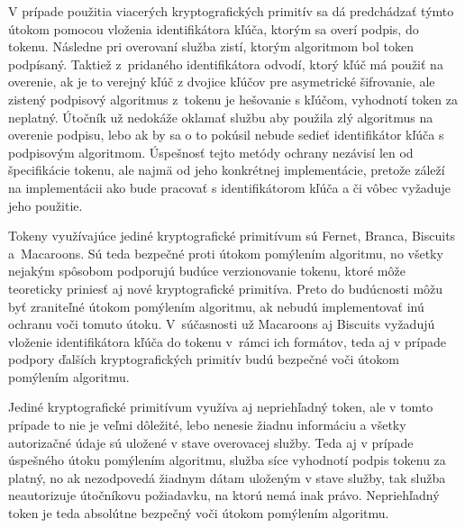 V prípade použitia viacerých kryptografických primitív sa dá predchádzať týmto útokom pomocou vloženia identifikátora kľúča, ktorým sa overí podpis, do tokenu. Následne pri overovaní služba zistí, ktorým algoritmom bol token podpísaný. Taktiež z~pridaného identifikátora odvodí, ktorý kľúč má použiť na overenie, ak je to verejný kľúč z dvojice kľúčov pre asymetrické šifrovanie, ale zistený podpisový algoritmus z~tokenu je hešovanie s kľúčom, vyhodnotí token za neplatný. Útočník už nedokáže oklamať službu aby použila zlý algoritmus na overenie podpisu, lebo ak by sa o to pokúsil nebude sedieť identifikátor kľúča s podpisovým algoritmom. Úspešnosť tejto metódy ochrany nezávisí len od špecifikácie tokenu, ale najmä od jeho konkrétnej implementácie, pretože záleží na implementácii ako bude pracovať s identifikátorom kľúča a či vôbec vyžaduje jeho použitie.

Tokeny využívajúce jediné kryptografické primitívum sú Fernet, Branca, Biscuits a~Macaroons. Sú teda bezpečné proti útokom pomýlením algoritmu, no všetky nejakým spôsobom podporujú budúce verzionovanie tokenu, ktoré môže teoreticky priniesť aj nové kryptografické primitíva. Preto do budúcnosti môžu byť zraniteľné útokom pomýlením algoritmu, ak nebudú implementovať inú ochranu voči tomuto útoku. V~súčasnosti už Macaroons aj Biscuits vyžadujú vloženie identifikátora kľúča do tokenu v~rámci ich formátov, teda aj v prípade podpory ďalších kryptografických primitív budú bezpečné voči útokom pomýlením algoritmu.

Jediné kryptografické primitívum využíva aj nepriehľadný token, ale v tomto prípade to nie je veľmi dôležité, lebo nenesie žiadnu informáciu a všetky autorizačné údaje sú uložené v stave overovacej služby. Teda aj v prípade úspešného útoku pomýlením algoritmu, služba síce vyhodnotí podpis tokenu za platný, no ak nezodpovedá žiadnym dátam uloženým v stave služby, tak služba neautorizuje útočníkovu požiadavku, na ktorú nemá inak právo. Nepriehľadný token je teda absolútne bezpečný voči útokom pomýlením algoritmu.

